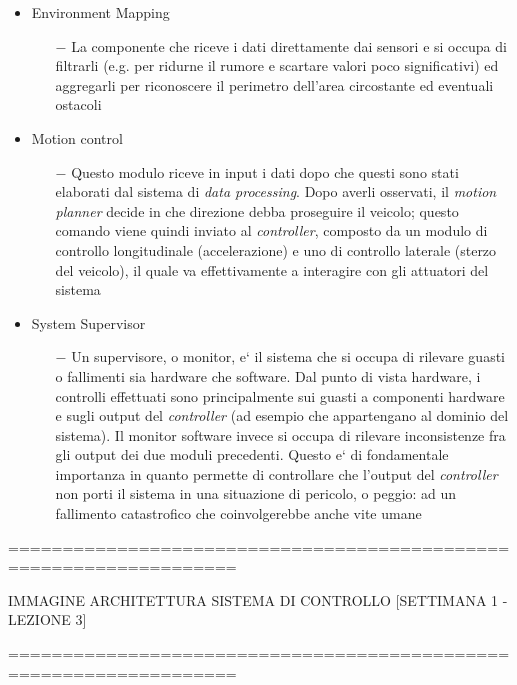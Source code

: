 \begin{itemize}
	\item Environment Mapping
	\begin{itemize}
		\item[$-$] La componente che riceve i dati direttamente dai sensori e si occupa di filtrarli (e.g. per ridurne il rumore e scartare valori poco significativi) ed aggregarli per riconoscere il perimetro dell'area circostante ed eventuali ostacoli
	\end{itemize}
	\item Motion control
	\begin{itemize}
		\item[$-$] Questo modulo riceve in input i dati dopo che questi sono stati elaborati dal sistema di \textsl{data processing}. Dopo averli osservati, il \textsl{motion planner} decide in che direzione debba proseguire il veicolo; questo comando viene quindi inviato al \textsl{controller}, composto da un modulo di controllo longitudinale (accelerazione) e uno di controllo laterale (sterzo del veicolo), il quale va effettivamente a interagire con gli attuatori del sistema
	\end{itemize}
	\item System Supervisor
	\begin{itemize}
		\item[$-$] Un supervisore, o monitor, e` il sistema che si occupa di rilevare guasti o fallimenti sia hardware che software. Dal punto di vista hardware, i controlli effettuati sono principalmente sui guasti a componenti hardware e sugli output del \textsl{controller} (ad esempio che appartengano al dominio del sistema). Il monitor software invece si occupa di rilevare inconsistenze fra gli output dei due moduli precedenti. Questo e` di fondamentale importanza in quanto permette di controllare che l'output del \textsl{controller} non porti il sistema in una situazione di pericolo, o peggio: ad un fallimento catastrofico che coinvolgerebbe anche vite umane
	\end{itemize}
\end{itemize}


===================================================================

IMMAGINE ARCHITETTURA SISTEMA DI CONTROLLO
[SETTIMANA 1 - LEZIONE 3]

===================================================================
\newline\newline

